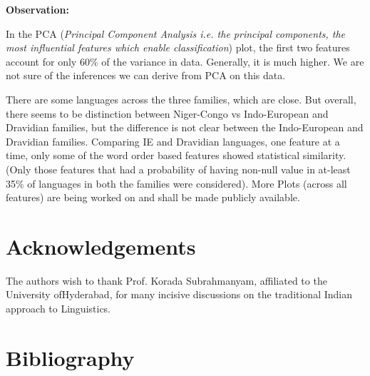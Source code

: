 \textbf{Observation:}

In the PCA (\textit{Principal Component Analysis i.e. the principal components, the most influential features which enable classification}) plot, the first two features account for only 60\% of the variance in data. Generally, it is much higher. We are not sure of the inferences we can derive from PCA on this data.

There are some languages across the three families, which are close. But overall, there seems to be distinction between Niger-Congo vs Indo-European and Dravidian families, but the difference is not clear between the Indo-European and Dravidian families. Comparing IE and Dravidian languages, one feature at a time, only some of the word order based features showed statistical similarity. (Only those features that had a probability of having non-null value in at-least 35\% of languages in both the families were considered). More Plots (across all features) are being worked on and shall be made publicly available.


\section*{Acknowledgements}

The authors wish to thank Prof. Korada Subrahmanyam, affiliated to the University ofHyderabad, for many incisive discussions on the traditional Indian approach to Linguistics.


\section*{Bibliography}

